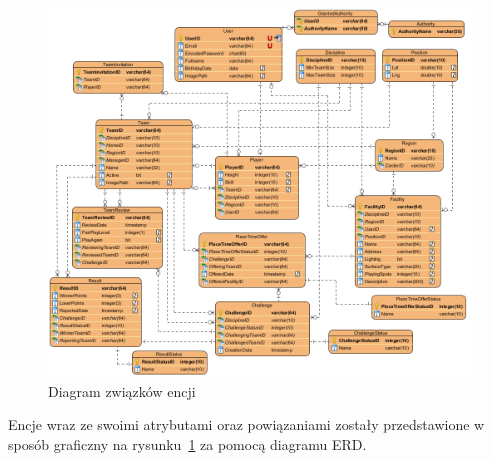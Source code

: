 \begin{figure}[ht]
\centering
\includegraphics[width=1\linewidth]{04-projekt/rys/erd2.PNG}
\caption{Diagram związków encji}
\label{fig:diagram-erd}
\end{figure}

Encje wraz ze swoimi atrybutami oraz powiązaniami zostały przedstawione w sposób graficzny na rysunku~\ref{fig:diagram-erd} za pomocą diagramu ERD.


